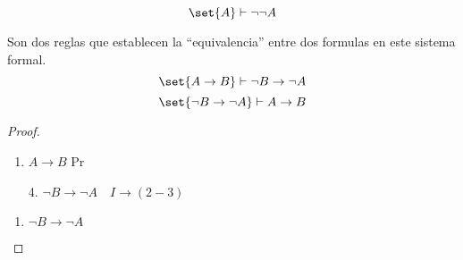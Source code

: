 \begin{theorem}
	\[\set{A} \vdash \neg \neg A \]
\end{theorem}

\begin{theorem}[Contraposicion, CP]
	Son dos reglas que establecen la ``equivalencia'' entre dos formulas en este sistema formal.
	\[
		\set{A \to B} \vdash \neg B \to \neg A
	\]
	\[
		\set{\neg B \to \neg A } \vdash A \to B
	\]
\end{theorem}
\begin{proof}
	~\begin{enumerate}
		\item \(A \to B \) Pr
	\end{enumerate}
	\begin{enumerate}
		\item[4.] \(\neg B \to \neg A \quad I\to(2-3)\)
	\end{enumerate}

	\begin{enumerate}
		\item \(\neg B \to \neg A \)
	\end{enumerate}
	\framedtext{
		\begin{enumerate}[resume]
			\item
		\end{enumerate}
	}
\end{proof}

